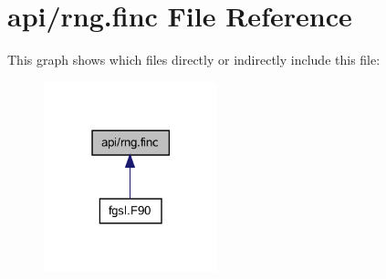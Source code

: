 \hypertarget{rng_8finc}{}\section{api/rng.finc File Reference}
\label{rng_8finc}
This graph shows which files directly or indirectly include this file\+:\nopagebreak
\begin{figure}[H]
\begin{center}
\leavevmode
\includegraphics[width=142pt]{rng_8finc__dep__incl}
\end{center}
\end{figure}
